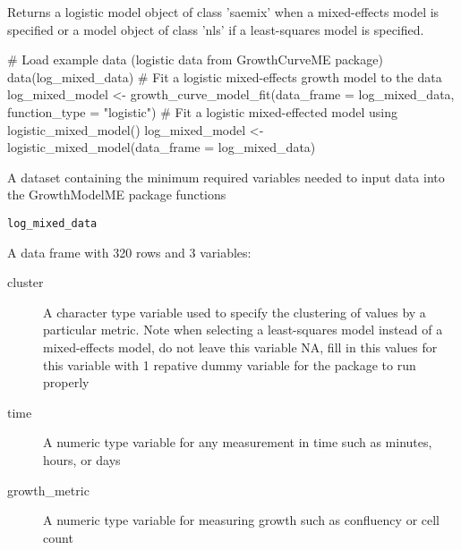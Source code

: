 \documentclass[a4paper]{book}
\begin{document}
%
\begin{Value}
Returns a logistic model object of class 'saemix' when a
mixed-effects model is specified or a model object of class 'nls' if a
least-squares model is specified.
\end{Value}
%
\begin{SeeAlso}
\end{SeeAlso}
%
\begin{Examples}
\begin{ExampleCode}
# Load example data (logistic data from GrowthCurveME package)
data(log_mixed_data)
# Fit a logistic mixed-effects growth model to the data
log_mixed_model <- growth_curve_model_fit(data_frame = log_mixed_data,
function_type = "logistic")
# Fit a logistic mixed-effected model using logistic_mixed_model()
log_mixed_model <- logistic_mixed_model(data_frame = log_mixed_data)
\end{ExampleCode}
\end{Examples}
%
\begin{Description}
A dataset containing the minimum required variables needed to input data
into the GrowthModelME package functions
\end{Description}
%
\begin{Usage}
\begin{verbatim}
log_mixed_data
\end{verbatim}
\end{Usage}
%
\begin{Format}
A data frame with 320 rows and 3 variables:
\begin{description}

\item[cluster] A character type variable used to specify the clustering
of values by a particular metric. Note when selecting a least-squares
model instead of a mixed-effects model, do not leave this variable NA,
fill in this values for this variable with 1 repative dummy variable for
the package to run properly
\item[time] A numeric type variable for any measurement in time such as
minutes, hours, or days
\item[growth\_metric] A numeric type variable for measuring growth such as
confluency or cell count

\end{description}

\end{Format}
\end{document}
